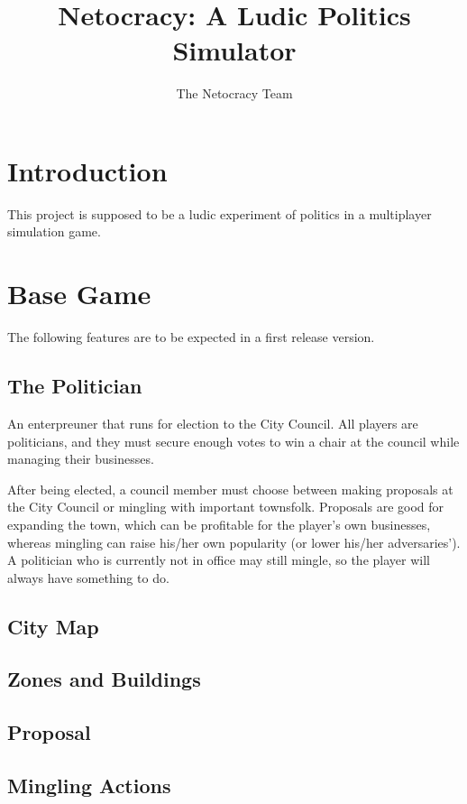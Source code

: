 \documentclass[a6paper]{report}
\title{Netocracy: A Ludic Politics Simulator}
\author{The Netocracy Team}
\begin{document}
\maketitle
\tableofcontents

\chapter{Introduction}

This project is supposed to be a ludic experiment of politics in a multiplayer simulation game.

\chapter{Base Game}

The following features are to be expected in a first release version.

\section{The Politician}

An enterpreuner that runs for election to the City Council. All players are politicians, and they must secure enough votes to win a chair at the council while managing their businesses.

After being elected, a council member must choose between making proposals at the City Council or mingling with important townsfolk. Proposals are good for expanding the town, which can be profitable for the player's own businesses, whereas mingling can raise his/her own popularity (or lower his/her adversaries'). A politician who is currently not in office may still mingle, so the player will always have something to do.

\section{City Map}

\section{Zones and Buildings}

\section{Proposal}

\section{Mingling Actions}
\end{document}
